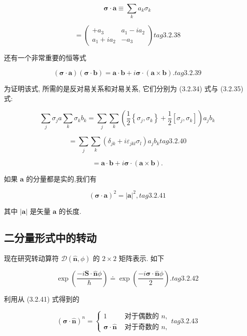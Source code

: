 $$
\mathbf{\sigma } \cdot \mathbf{a} \equiv \mathop{\sum }\limits_{k}{a}_{k}{\sigma }_{k}
$$

$$
= \left( \begin{matrix} + {a}_{3} & {a}_{1} - i{a}_{2} \\ {a}_{1} + i{a}_{2} & - {a}_{3} \end{matrix}\right) tag{3. 2.38}
$$

还有一个非常重要的恒等式

$$
\left( {\mathbf{\sigma } \cdot \mathbf{a}}\right) \left( {\mathbf{\sigma } \cdot \mathbf{b}}\right) = \mathbf{a} \cdot \mathbf{b} + i\mathbf{\sigma } \cdot \left( {\mathbf{a} \times \mathbf{b}}\right) . tag{3. 2.39}
$$

为证明该式, 所需的是反对易关系和对易关系, 它们分别为 (3.2.34) 式与 (3.2.35) 式:

$$
\mathop{\sum }\limits_{j}{\sigma }_{j}a\mathop{\sum }\limits_{k}{\sigma }_{k}{b}_{k} = \mathop{\sum }\limits_{j}\mathop{\sum }\limits_{k}\left( {\frac{1}{2}\left\{ {{\sigma }_{j},{\sigma }_{k}}\right\} + \frac{1}{2}\left\lbrack {{\sigma }_{j},{\sigma }_{k}}\right\rbrack }\right) {a}_{j}{b}_{k}
$$

$$
= \mathop{\sum }\limits_{j}\mathop{\sum }\limits_{k}\left( {{\delta }_{jk} + i{\varepsilon }_{jkl}{\sigma }_{l}}\right) {a}_{j}{b}_{k} tag{3. 2.40}
$$

$$
= \mathbf{a} \cdot \mathbf{b} + i\mathbf{\sigma } \cdot \left( {\mathbf{a} \times \mathbf{b}}\right) .
$$

如果 $\mathbf{a}$ 的分量都是实的,我们有

$$
{\left( \mathbf{\sigma } \cdot \mathbf{a}\right) }^{2} = {\left| \mathbf{a}\right| }^{2}, tag{3. 2.41}
$$

其中 $\left| \mathbf{a}\right|$ 是矢量 $\mathbf{a}$ 的长度.

\subsection{二分量形式中的转动}

现在研究转动算符 $\mathcal{D}\left( {\widehat{\mathbf{n}},\phi }\right)$ 的 $2 \times 2$ 矩阵表示. 如下

$$
\exp \left( \frac{-i\mathbf{S} \cdot \widehat{\mathbf{n}}\phi }{\hslash }\right) \doteq \exp \left( \frac{-i\mathbf{\sigma } \cdot \widehat{\mathbf{n}}\phi }{2}\right) . tag{3. 2.42}
$$

利用从 (3.2.41) 式得到的

$$
{\left( \mathbf{\sigma } \cdot \widehat{\mathbf{n}}\right) }^{n} = \left\{ \begin{array}{ll} 1 & \text{ 对于偶数的 }n, \\ \mathbf{\sigma } \cdot \widehat{\mathbf{n}} & \text{ 对于奇数的 }n, \end{array}\right. tag{3.2.43}
$$

